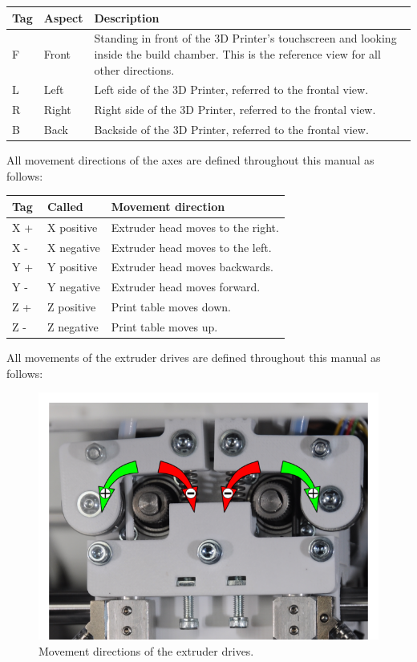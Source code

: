 \begin{table}[H]
  \centering
  \begin{tabulary}{\textwidth}{ L L L }
    \toprule
    Tag      & 	Aspect     &	Description \\
    \midrule
      F 	   &  Front      &	Standing in front of the 3D Printer's touchscreen and looking inside the build chamber. 
                              This is the reference view for all other directions.\\
      L      &	Left       &	Left side of the 3D Printer, referred to the frontal view.\\
      R 	   &  Right      &	Right side of the 3D Printer, referred to the frontal view.\\
      B      &	Back       &	Backside of the 3D Printer, referred to the frontal view.\\ 
    \bottomrule
  \end{tabulary}
\end{table}

All movement directions of the axes are defined throughout this manual as follows: 

\begin{table}[H]
  \centering
  \begin{tabulary}{\textwidth}{ L L L }
    \toprule
    Tag                & 	Called &  	Movement direction \\
    \midrule
    X \textcircled{+}  & 	X positive  &  	Extruder head moves to the right.\\
    X \textcircled{-}  & 	X negative  & 	Extruder head moves to the left.\\
    Y \textcircled{+}  &  Y positive  & 	Extruder head moves backwards.\\
    Y \textcircled{-}  & 	Y negative  & 	Extruder head moves forward.\\
    Z \textcircled{+}  & 	Z positive  &  	Print table moves down.\\
    Z \textcircled{-}  & 	Z negative  & 	Print table moves up. \\
    \bottomrule
  \end{tabulary}
\end{table}

All movements of the extruder drives are defined throughout this manual as follows: 

\begin{figure}[H]
  \centering
  \includegraphics[width=.7\linewidth]{./img/desc_moving_drives.png}
  \caption{Movement directions of the extruder drives.}
\end{figure}

